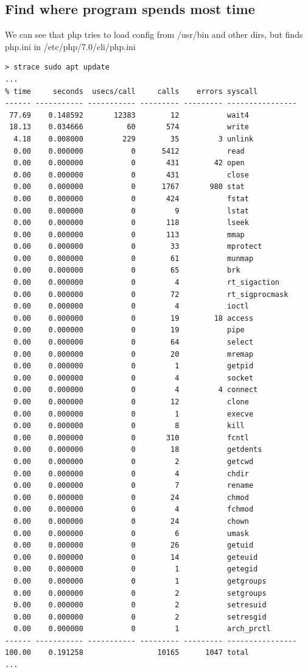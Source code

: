 \documentclass[10pt]{article}
\begin{document}
\subsection{Find where program spends most time}
We can see that php tries to load config from /usr/bin and other dirs, but finds php.ini in /etc/php/7.0/cli/php.ini
\begin{verbatim}
> strace sudo apt update
...
% time     seconds  usecs/call     calls    errors syscall
------ ----------- ----------- --------- --------- ----------------
 77.69    0.148592       12383        12           wait4
 18.13    0.034666          60       574           write
  4.18    0.008000         229        35         3 unlink
  0.00    0.000000           0      5412           read
  0.00    0.000000           0       431        42 open
  0.00    0.000000           0       431           close
  0.00    0.000000           0      1767       980 stat
  0.00    0.000000           0       424           fstat
  0.00    0.000000           0         9           lstat
  0.00    0.000000           0       118           lseek
  0.00    0.000000           0       113           mmap
  0.00    0.000000           0        33           mprotect
  0.00    0.000000           0        61           munmap
  0.00    0.000000           0        65           brk
  0.00    0.000000           0         4           rt_sigaction
  0.00    0.000000           0        72           rt_sigprocmask
  0.00    0.000000           0         4           ioctl
  0.00    0.000000           0        19        18 access
  0.00    0.000000           0        19           pipe
  0.00    0.000000           0        64           select
  0.00    0.000000           0        20           mremap
  0.00    0.000000           0         1           getpid
  0.00    0.000000           0         4           socket
  0.00    0.000000           0         4         4 connect
  0.00    0.000000           0        12           clone
  0.00    0.000000           0         1           execve
  0.00    0.000000           0         8           kill
  0.00    0.000000           0       310           fcntl
  0.00    0.000000           0        18           getdents
  0.00    0.000000           0         2           getcwd
  0.00    0.000000           0         4           chdir
  0.00    0.000000           0         7           rename
  0.00    0.000000           0        24           chmod
  0.00    0.000000           0         4           fchmod
  0.00    0.000000           0        24           chown
  0.00    0.000000           0         6           umask
  0.00    0.000000           0        26           getuid
  0.00    0.000000           0        14           geteuid
  0.00    0.000000           0         1           getegid
  0.00    0.000000           0         1           getgroups
  0.00    0.000000           0         2           setgroups
  0.00    0.000000           0         2           setresuid
  0.00    0.000000           0         2           setresgid
  0.00    0.000000           0         1           arch_prctl
------ ----------- ----------- --------- --------- ----------------
100.00    0.191258                 10165      1047 total
...
\end{verbatim}
\end{document}
